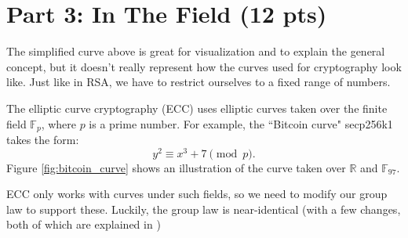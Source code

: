 \documentclass{article}
\begin{document}
\section*{Part 3: In The Field (12 pts)}
    The simplified curve above is great for visualization and to explain the general concept, but it doesn't really represent how the curves used for cryptography look like. Just like in RSA, we have to restrict ourselves to a fixed range of numbers.

    \vspace{3mm}
    The elliptic curve cryptography (ECC) uses elliptic curves taken over the finite field $\mathbb{F}_{p}$, where $p$ is a prime number. For example, the ``Bitcoin curve" secp256k1 takes the form: $$y^{2} \equiv x^{3} + 7 \pmod{p}.$$ Figure \ref*{fig:bitcoin_curve} shows an illustration of the curve taken over $\mathbb{R}$ and $\mathbb{F}_{97}$.

    \vspace{2mm}
    ECC only works with curves under such fields, so we need to modify our group law to support these. Luckily, the group law is near-identical (with a few changes, both of which are explained in \cite{ec_blog})
\end{document}
